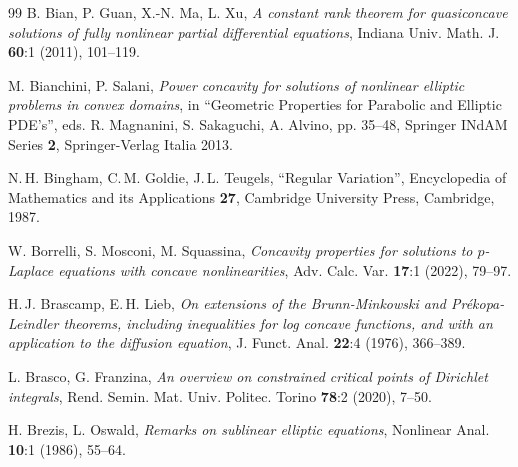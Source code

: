 \documentclass[12pt]{amsart}
\numberwithin{equation}{section}
\theoremstyle{plain}
\theoremstyle{plain}
\theoremstyle{plain}
\theoremstyle{definition}
\begin{document}
\begin{thebibliography}{99}
B. Bian, P. Guan, X.-N. Ma, L. Xu,
\emph{A constant rank theorem for quasiconcave solutions of fully nonlinear partial differential equations},
Indiana Univ. Math. J. \textbf{60}:1 (2011), 101--119.

M. Bianchini, P. Salani,
\emph{Power concavity for solutions of nonlinear elliptic problems in convex domains},
in ``Geometric Properties for Parabolic and Elliptic PDE's'', eds. R. Magnanini, S. Sakaguchi, A. Alvino, pp. 35--48, 
Springer INdAM Series \textbf{2}, Springer-Verlag Italia 2013.

N.$\,$H. Bingham, C.$\,$M. Goldie, J.$\,$L. Teugels,
``Regular Variation'',
Encyclopedia of Mathematics and its Applications \textbf{27}, Cambridge University Press, Cambridge, 1987.

W. Borrelli, S. Mosconi, M. Squassina,
\emph{Concavity properties for solutions to $p$-Laplace equations with concave nonlinearities},
Adv. Calc. Var. \textbf{17}:1 (2022), 79--97.

H.$\,$J. Brascamp, E.$\,$H. Lieb,
\emph{On extensions of the Brunn-Minkowski and Prékopa-Leindler theorems, including inequalities for log concave functions, and with an application to the diffusion equation},
J. Funct. Anal. \textbf{22}:4 (1976), 366--389.

L. Brasco, G. Franzina,
\emph{An overview on constrained critical points of Dirichlet integrals},
Rend. Semin. Mat. Univ. Politec. Torino \textbf{78}:2 (2020), 7--50.


H. Brezis, L. Oswald,
\emph{Remarks on sublinear elliptic equations},
Nonlinear Anal. \textbf{10}:1 (1986), 55--64.





\end{thebibliography}
\end{document}
